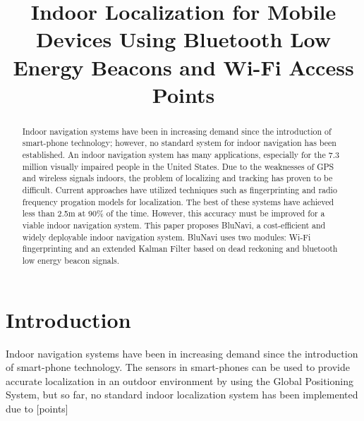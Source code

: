 \documentclass[conference]{IEEEtran}
\begin{document}
\title{Indoor Localization for Mobile Devices Using Bluetooth Low Energy Beacons and Wi-Fi Access Points}

\author{
\and
{}
\and
{}
}

\maketitle

\begin{abstract}
Indoor navigation systems have been in increasing demand since the introduction of smart-phone technology; however, no standard system for indoor navigation has been established. An indoor navigation system has many applications, especially for the 7.3 million visually impaired people in the United States. Due to the weaknesses of GPS and wireless signals indoors, the problem of localizing and tracking has proven to be difficult. Current approaches have utilized techniques such as fingerprinting and radio frequency progation models for localization. The best of these systems have achieved less than 2.5m at 90\% of the time. However, this accuracy must be improved for a viable indoor navigation system. This paper proposes BluNavi, a cost-efficient and widely deployable indoor navigation system. BluNavi uses two modules: Wi-Fi fingerprinting and an extended Kalman Filter based on dead reckoning and bluetooth low energy beacon signals.
\end{abstract}


\section{Introduction}
Indoor navigation systems have been in increasing demand since the introduction of smart-phone technology. The sensors in smart-phones can be used to provide accurate localization in an outdoor environment by using the Global Positioning System, but so far, no standard indoor localization system has been implemented due to [points]
\end{document}
